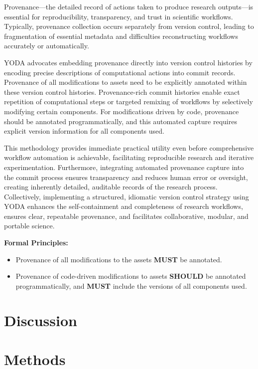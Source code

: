 \documentclass{article}
\begin{document}
Provenance—the detailed record of actions taken to produce research outputs—is essential for reproducibility, transparency, and trust in scientific workflows.
Typically, provenance collection occurs separately from version control, leading to fragmentation of essential metadata and difficulties reconstructing workflows accurately or automatically.

YODA advocates embedding provenance directly into version control histories by encoding precise descriptions of computational actions into commit records.
Provenance of all modifications to assets need to be explicitly annotated within these version control histories.
Provenance-rich commit histories enable exact repetition of computational steps or targeted remixing of workflows by selectively modifying certain components.
For modifications driven by code, provenance should be annotated programmatically, and this automated capture requires explicit version information for all components used.

This methodology provides immediate practical utility even before comprehensive workflow automation is achievable, facilitating reproducible research and iterative experimentation.
Furthermore, integrating automated provenance capture into the commit process ensures transparency and reduces human error or oversight, creating inherently detailed, auditable records of the research process.
Collectively, implementing a structured, idiomatic version control strategy using YODA enhances the self-containment and completeness of research workflows, ensures clear, repeatable provenance, and facilitates collaborative, modular, and portable science.

\textbf{Formal Principles:}

\begin{itemize}
\item Provenance of all modifications to the assets \textbf{MUST} be annotated.
\item Provenance of code-driven modifications to assets \textbf{SHOULD} be annotated programmatically, and \textbf{MUST} include the versions of all components used.
\end{itemize}

\section{Discussion}
\section{Methods}
\end{document}
